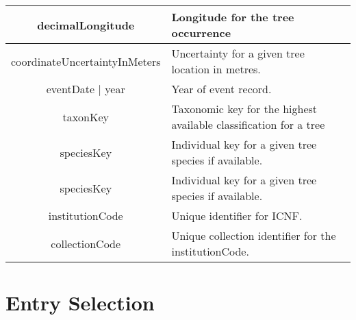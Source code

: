 \begin{table}[h!]
\begin{tabular}{|c|p{7.5cm}|}
decimalLongitude & Longitude for the tree occurrence \\
\hline

coordinateUncertaintyInMeters & Uncertainty for a given tree location in metres. \\
\hline

eventDate | year & Year of event record. \\
\hline

taxonKey & Taxonomic key for the highest available classification for a tree \\
\hline

speciesKey & Individual key for a given tree species if available. \\
\hline

speciesKey & Individual key for a given tree species if available. \\
\hline

institutionCode & Unique identifier for ICNF. \\
\hline

collectionCode & Unique collection identifier for the institutionCode. \\
\hline
\end{tabular}
\end{table}




\section{Entry Selection}
